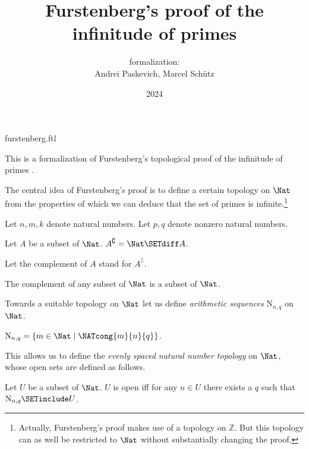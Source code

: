 \documentclass{article}
\title{Furstenberg's proof of the infinitude of primes}
\author{\Naproche formalization:\\[0.5em]Andrei Paskevich, Marcel Schütz}
\date{2024}
\newcommand{\N}{\mathrm{N}}
\newcommand{\Int}{\mathbb{Z}}
\begin{document}
\begin{smodule}{furstenberg.ftl}
\maketitle


\noindent This is a formalization of Furstenberg's topological proof of the
infinitude of primes \cite[p. 353]{Furstenberg1955}.

The central idea of Furstenberg's proof is to define a certain topology on
$\Nat$ from the properties of which we can deduce that the set of
primes is infinite.\footnote{Actually, Furstenberg's proof makes use of a
topology on $\Int$. But this topology can as well be restricted to
$\Nat$ without substantially changing the proof.}

\begin{forthel}
  Let $n, m, k$ denote natural numbers.
  Let $p, q$ denote nonzero natural numbers.

  \begin{definition}
    Let $A$ be a subset of $\Nat$.
    $A^\complement = \Nat \SETdiff A$.
  \end{definition}

  Let the complement of $A$ stand for $A^\complement$.

  \begin{lemma}
    The complement of any subset of $\Nat$ is a subset of $\Nat$.
  \end{lemma}
\end{forthel}

Towards a suitable topology on $\Nat$ let us define \textit{arithmetic
sequences} $\N_{n, q}$ on $\Nat$.

\begin{forthel}
  \begin{definition}
    $\N_{n, q} = \{ m \in \Nat \mid \NATcong{m}{n}{q} \}$.
  \end{definition}
\end{forthel}

This allows us to define the \textit{evenly spaced natural number
topology} on $\Nat$, whose open sets are defined as follows.

\begin{forthel}
  \begin{definition}
    Let $U$ be a subset of $\Nat$.
    $U$ is open iff for any $n \in U$ there exists a $q$ such that
    $\N_{n, q} \SETinclude U$.
  \end{definition}


\end{forthel}
\end{smodule}
\end{document}
